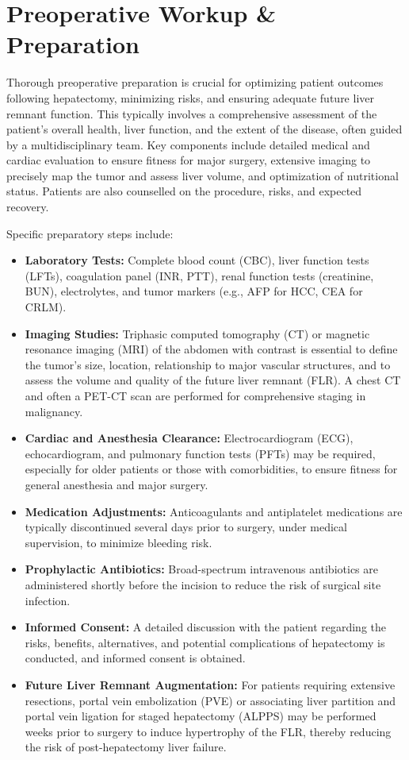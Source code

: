 \section*{Preoperative Workup \& Preparation}
Thorough preoperative preparation is crucial for optimizing patient outcomes following hepatectomy, minimizing risks, and ensuring adequate future liver remnant function. This typically involves a comprehensive assessment of the patient's overall health, liver function, and the extent of the disease, often guided by a multidisciplinary team. Key components include detailed medical and cardiac evaluation to ensure fitness for major surgery, extensive imaging to precisely map the tumor and assess liver volume, and optimization of nutritional status. Patients are also counselled on the procedure, risks, and expected recovery.

Specific preparatory steps include:
\begin{itemize}
  \item \textbf{Laboratory Tests:} Complete blood count (CBC), liver function tests (LFTs), coagulation panel (INR, PTT), renal function tests (creatinine, BUN), electrolytes, and tumor markers (e.g., AFP for HCC, CEA for CRLM).
  \item \textbf{Imaging Studies:} Triphasic computed tomography (CT) or magnetic resonance imaging (MRI) of the abdomen with contrast is essential to define the tumor's size, location, relationship to major vascular structures, and to assess the volume and quality of the future liver remnant (FLR). A chest CT and often a PET-CT scan are performed for comprehensive staging in malignancy.
  \item \textbf{Cardiac and Anesthesia Clearance:} Electrocardiogram (ECG), echocardiogram, and pulmonary function tests (PFTs) may be required, especially for older patients or those with comorbidities, to ensure fitness for general anesthesia and major surgery.
  \item \textbf{Medication Adjustments:} Anticoagulants and antiplatelet medications are typically discontinued several days prior to surgery, under medical supervision, to minimize bleeding risk.
  \item \textbf{Prophylactic Antibiotics:} Broad-spectrum intravenous antibiotics are administered shortly before the incision to reduce the risk of surgical site infection.
  \item \textbf{Informed Consent:} A detailed discussion with the patient regarding the risks, benefits, alternatives, and potential complications of hepatectomy is conducted, and informed consent is obtained.
  \item \textbf{Future Liver Remnant Augmentation:} For patients requiring extensive resections, portal vein embolization (PVE) or associating liver partition and portal vein ligation for staged hepatectomy (ALPPS) may be performed weeks prior to surgery to induce hypertrophy of the FLR, thereby reducing the risk of post-hepatectomy liver failure.
\end{itemize}

